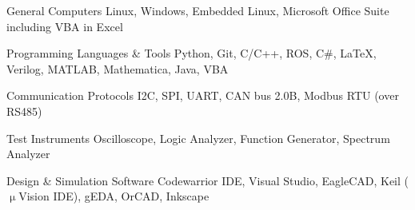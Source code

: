

\begin{cvskills}

  \cvskill
    {General Computers} %
    {Linux, Windows, Embedded Linux, Microsoft Office Suite including VBA in Excel} %

  \cvskill
    {Programming Languages \& Tools} %
    {Python, Git, C/C++, ROS, C\#, LaTeX, Verilog, MATLAB, Mathematica, Java, VBA} %

  \cvskill
    {Communication Protocols} %
    {I2C, SPI, UART, CAN bus 2.0B, Modbus RTU (over RS485)} %

  \cvskill
    {Test Instruments} %
    {Oscilloscope, Logic Analyzer, Function Generator, Spectrum Analyzer} %

  \cvskill
    {Design \& Simulation Software} %
    {Codewarrior IDE, Visual Studio, EagleCAD, Keil ($\upmu$Vision IDE), gEDA, OrCAD, Inkscape} %

\end{cvskills}
